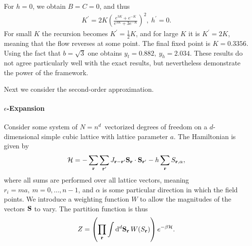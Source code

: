 For $h = 0$, we obtain $B = C = 0$, and thus
\begin{align*}
	K^{\prime} = 2K\left(\frac{e^{3K} + e^{-K}}{e^{3K} + 3e^{-K}}\right)^{2},\ h^{\prime} = 0.
\end{align*}
For small $K$ the recursion becomes $K^{\prime} = \frac{1}{2}K$, and for large $K$ it is $K^{\prime} = 2K$, meaning that the flow reverses at some point. The final fixed point is $K = 0.3356$. Using the fact that $b = \sqrt{3}$ one obtains  $y_{t} = 0.882,\ y_{h} = 2.034$. These results do not agree particularly well with the exact results, but nevertheless demonstrate the power of the framework.

Next we consider the second-order approximation.

\paragraph{$\epsilon$-Expansion}
Consider some system of $N = n^{d}$ vectorized degrees of freedom on a $d$-dimensional simple cubic lattice with lattice parameter $a$. The  Hamiltonian is given by
\begin{align*}
	\mathcal{H} = -\sum\limits_{\vb{r}}\sum\limits_{\vb{r}^{\prime}}J_{\vb{r} - \vb{r}^{\prime}}\vb{S}_{\vb{r}}\cdot\vb{S}_{\vb{r}^{\prime}} - h\sum\limits_{\vb{r}}S_{\vb{r}, \alpha},
\end{align*}
where all sums are performed over all lattice vectors, meaning $r_{i} = ma,\ m = 0, \dots, n - 1$,  and $\alpha$ is some particular direction in which the field points. We introduce a weighting function $W$ to allow the magnitudes of the vectors $\vb{S}$ to vary. The partition function is thus
\begin{align*}
	Z = \left(\prod\limits_{\vb{r}}\int\limits_{}^{}\dd[d]{\vb{S}_{\vb{r}}}W(S_{\vb{r}})\right)e^{-\beta\mathcal{H}}.
\end{align*}

